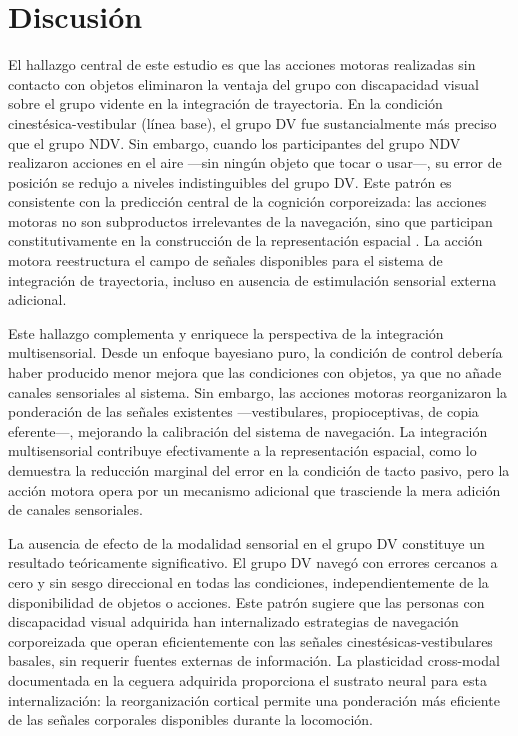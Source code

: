 \documentclass[12pt,letterpaper]{article}
\begin{document}
\section{Discusión}

El hallazgo central de este estudio es que las acciones motoras realizadas sin contacto con objetos eliminaron la ventaja del grupo con discapacidad visual sobre el grupo vidente en la integración de trayectoria. En la condición cinestésica-vestibular (línea base), el grupo DV fue sustancialmente más preciso que el grupo NDV. Sin embargo, cuando los participantes del grupo NDV realizaron acciones en el aire ---sin ningún objeto que tocar o usar---, su error de posición se redujo a niveles indistinguibles del grupo DV. Este patrón es consistente con la predicción central de la cognición corporeizada: las acciones motoras no son subproductos irrelevantes de la navegación, sino que participan constitutivamente en la construcción de la representación espacial \parencite{Shapiro2019,Wilson2002}. La acción motora reestructura el campo de señales disponibles para el sistema de integración de trayectoria, incluso en ausencia de estimulación sensorial externa adicional.

Este hallazgo complementa y enriquece la perspectiva de la integración multisensorial. Desde un enfoque bayesiano puro, la condición de control debería haber producido menor mejora que las condiciones con objetos, ya que no añade canales sensoriales al sistema. Sin embargo, las acciones motoras reorganizaron la ponderación de las señales existentes ---vestibulares, propioceptivas, de copia eferente---, mejorando la calibración del sistema de navegación. La integración multisensorial contribuye efectivamente a la representación espacial, como lo demuestra la reducción marginal del error en la condición de tacto pasivo, pero la acción motora opera por un mecanismo adicional que trasciende la mera adición de canales sensoriales.

La ausencia de efecto de la modalidad sensorial en el grupo DV constituye un resultado teóricamente significativo. El grupo DV navegó con errores cercanos a cero y sin sesgo direccional en todas las condiciones, independientemente de la disponibilidad de objetos o acciones. Este patrón sugiere que las personas con discapacidad visual adquirida han internalizado estrategias de navegación corporeizada que operan eficientemente con las señales cinestésicas-vestibulares basales, sin requerir fuentes externas de información. La plasticidad cross-modal documentada en la ceguera adquirida \parencite{Bleau2022meta,Mowad2020} proporciona el sustrato neural para esta internalización: la reorganización cortical permite una ponderación más eficiente de las señales corporales disponibles durante la locomoción.
\end{document}
